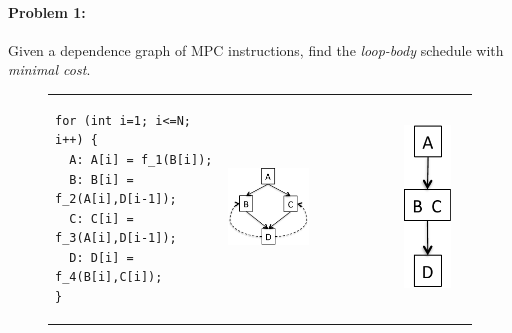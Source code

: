 \documentclass[sigconf, screen, natbib=false, dvipsnames, table]{acmart}
\theoremstyle{definition}
\begin{document}
\paragraph{Problem 1:} Given a dependence graph of MPC instructions, find the \emph{loop-body} schedule 
with \emph{minimal cost}.

\begin{figure}[tbhp]
\begin{tabular}{llll}
\begin{minipage}[b]{4.25cm}

\begin{verbatim}
for (int i=1; i<=N; i++) {
  A: A[i] = f_1(B[i]);
  B: B[i] = f_2(A[i],D[i-1]);
  C: C[i] = f_3(A[i],D[i-1]);
  D: D[i] = f_4(B[i],C[i]);
}
\end{verbatim}
\end{minipage} 

&

\begin{minipage}[b]{4.25cm}
\includegraphics[width=0.5\textwidth]{figs/dependenceGraph.pdf}
\end{minipage}


&

\begin{minipage}[b]{4.25cm}
\includegraphics[height=0.15\textheight]{figs/MPCloop.pdf}
\end{minipage}


\end{tabular}
\end{figure}
\end{document}
